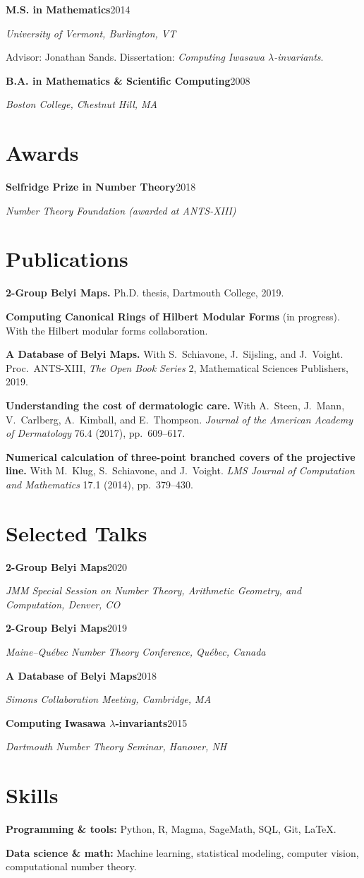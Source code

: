 \documentclass[11pt]{article}
\newcommand{\cventry}[3]{%
  \textbf{#1}\hfill #3\par
  {\itshape #2}\par
}
\begin{document}
\cventry{M.S. in Mathematics}{University of Vermont, Burlington, VT}{2014}
Advisor: Jonathan Sands. Dissertation: \textit{Computing Iwasawa $\lambda$-invariants}.
\medskip

\cventry{B.A. in Mathematics \& Scientific Computing}{Boston College, Chestnut Hill, MA}{2008}

\section{Awards}

\cventry{Selfridge Prize in Number Theory}{Number Theory Foundation (awarded at ANTS-XIII)}{2018}

\section{Publications}

\textbf{2-Group Belyi Maps.} Ph.D. thesis, Dartmouth College, 2019.
\medskip

\textbf{Computing Canonical Rings of Hilbert Modular Forms} (in progress). With the
Hilbert modular forms collaboration.
\medskip

\textbf{A Database of Belyi Maps.} With S.~Schiavone, J.~Sijsling, and J.~Voight.
Proc.\ ANTS-XIII, \textit{The Open Book Series} 2, Mathematical Sciences Publishers, 2019.
\medskip

\textbf{Understanding the cost of dermatologic care.} With A.~Steen, J.~Mann,
V.~Carlberg, A.~Kimball, and E.~Thompson. \textit{Journal of the American Academy
of Dermatology} 76.4 (2017), pp.~609--617.
\medskip

\textbf{Numerical calculation of three-point branched covers of the projective line.}
With M.~Klug, S.~Schiavone, and J.~Voight. \textit{LMS Journal of Computation and
Mathematics} 17.1 (2014), pp.~379--430.

\section{Selected Talks}

\cventry{2-Group Belyi Maps}{JMM Special Session on Number Theory, Arithmetic Geometry, and Computation, Denver, CO}{2020}
\medskip

\cventry{2-Group Belyi Maps}{Maine--Qu\'ebec Number Theory Conference, Qu\'ebec, Canada}{2019}
\medskip

\cventry{A Database of Belyi Maps}{Simons Collaboration Meeting, Cambridge, MA}{2018}
\medskip

\cventry{Computing Iwasawa $\lambda$-invariants}{Dartmouth Number Theory Seminar, Hanover, NH}{2015}

\section{Skills}

\textbf{Programming \& tools:} Python, R, Magma, SageMath, SQL, Git, \LaTeX.\par
\textbf{Data science \& math:} Machine learning, statistical modeling, computer
vision, computational number theory.
\end{document}
